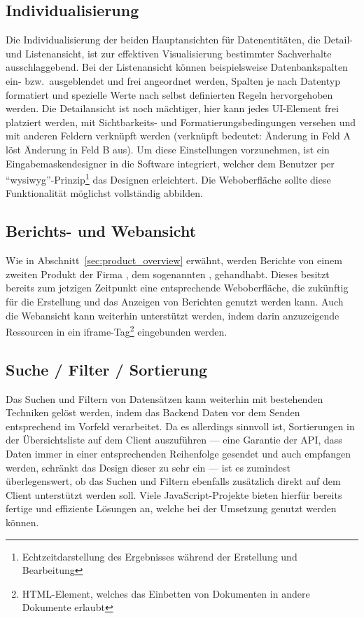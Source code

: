 \subsection{Individualisierung}\label{subsec:func_req_individualisation}
Die Individualisierung der beiden Hauptansichten für Datenentitäten, die Detail- und Listenansicht, ist zur effektiven Visualisierung bestimmter Sachverhalte ausschlaggebend. Bei der Listenansicht können beispielsweise Datenbankspalten ein- bzw.\ ausgeblendet und frei angeordnet werden, Spalten je nach Datentyp formatiert und spezielle Werte nach selbst definierten Regeln hervorgehoben werden. Die Detailansicht ist noch mächtiger, hier kann jedes UI-Element frei platziert werden, mit Sichtbarkeits- und Formatierungsbedingungen versehen und mit anderen Feldern verknüpft werden (verknüpft bedeutet: Änderung in Feld A löst Änderung in Feld B aus). Um diese Einstellungen vorzunehmen, ist ein Eingabemaskendesigner in die Software integriert, welcher dem Benutzer per ``\gls{wysiwyg}''-Prinzip\footnote{Echtzeitdarstellung des Ergebnisses während der Erstellung und Bearbeitung} das Designen erleichtert.
Die Weboberfläche sollte diese Funktionalität möglichst vollständig abbilden.

\subsection{Berichts- und Webansicht}
Wie in Abschnitt~\ref{sec:product_overview} erwähnt, werden Berichte von einem zweiten Produkt der Firma , dem sogenannten , gehandhabt. Dieses besitzt bereits zum jetzigen Zeitpunkt eine entsprechende Weboberfläche, die zukünftig für die Erstellung und das Anzeigen von Berichten genutzt werden kann. 
Auch die Webansicht kann weiterhin unterstützt werden, indem darin anzuzeigende Ressourcen in ein iframe-Tag\footnote{HTML-Element, welches das Einbetten von Dokumenten in andere Dokumente erlaubt} eingebunden werden.

\subsection{Suche / Filter / Sortierung}\label{subsec:func_req_search-filter-sorting}
Das Suchen und Filtern von Datensätzen kann weiterhin mit bestehenden Techniken gelöst werden, indem das Backend Daten vor dem Senden entsprechend im Vorfeld verarbeitet. Da es allerdings sinnvoll ist, Sortierungen in der Übersichtsliste auf dem Client auszuführen --- eine Garantie der API, dass Daten immer in einer entsprechenden Reihenfolge gesendet und auch empfangen werden, schränkt das Design dieser zu sehr ein --- ist es zumindest überlegenswert, ob das Suchen und Filtern ebenfalls zusätzlich direkt auf dem Client unterstützt werden soll. Viele JavaScript-Projekte bieten hierfür bereits fertige und effiziente Lösungen an, welche bei der Umsetzung genutzt werden können.

